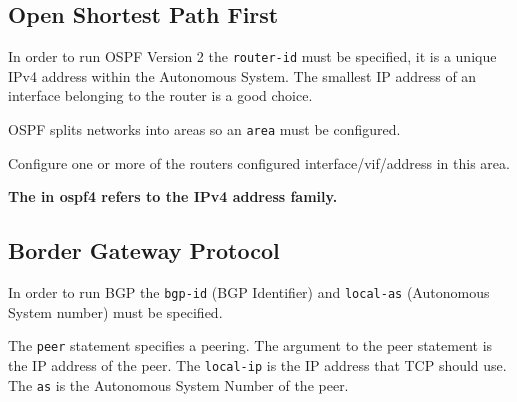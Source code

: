 \newpage
\subsection{Open Shortest Path First}
\label{sec:protocols:ospf}

In order to run OSPF Version 2 the {\tt router-id} must be specified, it
is a unique IPv4 address within the Autonomous System. The smallest IP
address of an interface belonging to the router is a good choice.

OSPF splits networks into areas so an {\tt area} must be configured.

Configure one or more of the routers configured interface/vif/address
in this area.

{\bf The {} in {\stt ospf4} refers to the IPv4 address family.}

\vspace{0.1in}
\noindent{}

\newpage
\subsection{Border Gateway Protocol}
\label{sec:protocols:bgp}

In order to run BGP the {\tt bgp-id} (BGP Identifier) and {\tt local-as}
(Autonomous System number) must be specified.

The {\tt peer} statement specifies a peering. The argument to the peer
statement is the IP address of the peer. The {\tt local-ip} is the IP
address that TCP should use. The {\tt as} is the Autonomous System Number
of the peer.

